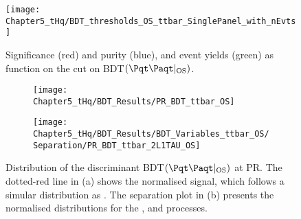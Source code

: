 \begin{figure}[h]
\centering
  \texttt{[image: Chapter5\_tHq/BDT\_thresholds\_OS\_ttbar\_SinglePanel\_with\_nEvts]}
\caption{Significance (red) and \ttbar purity (blue), and \ttbar event yields (green) as function on the cut on BDT$(\ttbar|_{\text{OS}})$.}
\label{fig:ChaptH:EventSelection:CR_OS:Significance}
\end{figure}


\begin{figure}[h]
\centering
\begin{subfigure}{.45\textwidth}
  \centering
  \texttt{[image: Chapter5\_tHq/BDT\_Results/PR\_BDT\_ttbar\_OS]}
  \caption{}
\end{subfigure}%
\begin{subfigure}{.5 \textwidth}
  \centering
  \texttt{[image: Chapter5\_tHq/BDT\_Results/BDT\_Variables\_ttbar\_OS/Separation/PR\_BDT\_ttbar\_2L1TAU\_OS]}
  \caption{}
\end{subfigure}
\caption{Distribution of the discriminant BDT$(\ttbar|_{\text{OS}})$ at PR.
The dotted-red line in (a) shows the normalised \tHq signal, which follows a simular 
distribution as \ttbar. The separation plot in (b) presents the normalised distributions 
for the \tHq, \ttbar and \Zjets processes.}
\label{fig:ChaptH:EventSelection:SR:OS:BDT_tt_score_distribution}
\end{figure}


